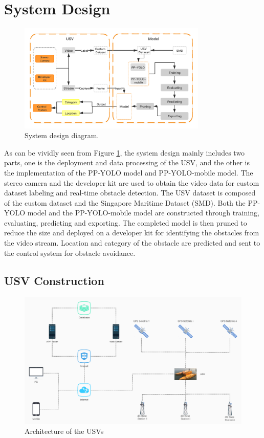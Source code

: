 \documentclass[sensors,article,submit,moreauthors,pdftex]{Definitions/mdpi}
\begin{document}
\section{System Design}

\begin{figure}[htbp]
\centering
\includegraphics[width=0.8\textwidth]{images/design.png}
\caption{System design diagram.}
\label{fig:system architecture}
\end{figure}

As can be vividly seen from Figure \ref{fig:system architecture}, the system design mainly includes two parts, one is the deployment and data processing of the USV, and the other is the implementation of the PP-YOLO model and  PP-YOLO-mobile model. The stereo camera and the developer kit are used to obtain the video data for custom dataset labeling and real-time obstacle detection. The USV dataset is composed of the custom dataset and the Singapore Maritime Dataset (SMD). Both the PP-YOLO model and the PP-YOLO-mobile model are constructed through training, evaluating, predicting and exporting. The completed model is then pruned to reduce the size and deployed on a developer kit for identifying the obstacles from the video stream. Location and category of the obstacle are predicted and sent to the control system for obstacle avoidance.


\subsection{USV Construction}
\begin{figure}[htbp]
\centering
\includegraphics[width=1\columnwidth]{images/USV-architecture.jpg}
\caption{Architecture of the USVs}
\label{fig:Architecture of USVs}
\end{figure}
\end{document}
